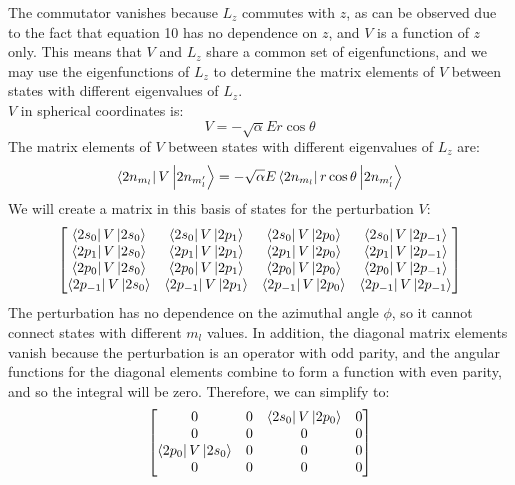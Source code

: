 \documentclass[12pt]{article}
\begin{document}
The commutator vanishes because $L_z$ commutes with $z$, as can be observed due to the fact that equation 10 has no dependence on $z$, and $V$ is a function of $z$ only. This means that $V$ and $L_z$ share a common set of eigenfunctions, and we may use the eigenfunctions of $L_z$ to determine the matrix elements of $V$ between states with different eigenvalues of $L_z$. \\
$V$ in spherical coordinates is:
\begin{equation}
  V = -\sqrt{\alpha} E r \cos \theta
\end{equation}
The matrix elements of $V$ between states with different eigenvalues of $L_z$ are:
\begin{equation}
  \bra{2n_{m_l}}V\ket{2n_{m_l'}} = -\sqrt{\alpha} E \bra{2n_{m_l}}r \cos \theta\ket{2n_{m_l'}}
\end{equation}
We will create a matrix in this basis of states for the perturbation $V$:
\begin{equation}
  \begin{bmatrix}
    \bra{2s_{0}}V\ket{2s_{0}} & \bra{2s_{0}}V\ket{2p_{1}} & \bra{2s_{0}}V\ket{2p_{0}} & \bra{2s_{0}}V\ket{2p_{-1}} \\
    \bra{2p_{1}}V\ket{2s_{0}} & \bra{2p_{1}}V\ket{2p_{1}} & \bra{2p_{1}}V\ket{2p_{0}} & \bra{2p_{1}}V\ket{2p_{-1}} \\
    \bra{2p_{0}}V\ket{2s_{0}} & \bra{2p_{0}}V\ket{2p_{1}} & \bra{2p_{0}}V\ket{2p_{0}} & \bra{2p_{0}}V\ket{2p_{-1}} \\
    \bra{2p_{-1}}V\ket{2s_{0}} & \bra{2p_{-1}}V\ket{2p_{1}} & \bra{2p_{-1}}V\ket{2p_{0}} & \bra{2p_{-1}}V\ket{2p_{-1}}
  \end{bmatrix}
\end{equation}
The perturbation has no dependence on the azimuthal angle $\phi$, so it cannot connect states with different $m_l$ values. In addition, the diagonal matrix elements vanish because the perturbation is an operator with odd parity, and the angular functions for the diagonal elements combine to form a function with even parity, and so the integral will be zero. Therefore, we can simplify to:
\begin{equation}
  \begin{bmatrix}
    0 & 0 & \bra{2s_{0}}V\ket{2p_{0}} & 0 \\
    0 & 0 & 0 & 0 \\
    \bra{2p_{0}}V\ket{2s_{0}} & 0 & 0 & 0 \\
    0 & 0 & 0 & 0
  \end{bmatrix}
\end{equation}
\end{document}
